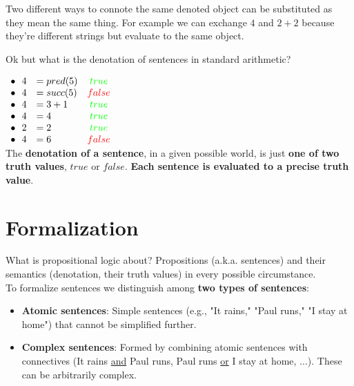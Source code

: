 	\begin{property}
	  Two different ways to connote the same denoted object can be substituted as they mean the same thing. For example we can exchange $4$ and $2+2$ because they're different strings but evaluate to the same object.
	\end{property}

	Ok but what is the denotation of sentences in standard arithmetic? \vspace{0.3cm}

$
\begin{array}{llc}
\bullet \ \ 4 &= pred(5) & {\color{green} true} \\
\bullet \ \ 4 &= succ(5) & {\color{red} false} \\
\bullet \ \ 4 &= 3+1 & {\color{green} true} \\
\bullet \ \ 4 &= 4 & {\color{green} true} \\
\bullet \ \ 2 &= 2 & {\color{green} true} \\
\bullet \ \ 4 &= 6 & {\color{red} false} \\

\end{array}
$ \\

	The \textbf{denotation of a sentence}, in a given possible world, is just \textbf{one of two truth values}, $true$ or $false$. \textbf{Each sentence is evaluated to a precise truth value}.

	\section{Formalization}
	What is propositional logic about? Propositions (a.k.a. sentences) and their semantics (denotation, their truth values) in every possible circumstance.\\

	To formalize sentences we distinguish among \textbf{two types of sentences}:
	\begin{itemize}
		\item \textbf{Atomic sentences}: Simple sentences (e.g., "It rains," "Paul runs," "I stay at home") that cannot be simplified further.

		\item \textbf{Complex sentences}: Formed by combining atomic sentences with connectives (It rains \underline{and} Paul runs, Paul runs \underline{or} I stay at home, ...). These can be arbitrarily complex.
	\end{itemize}

